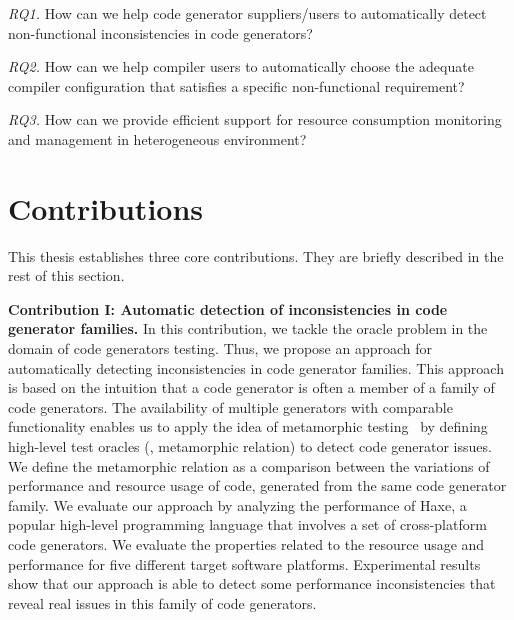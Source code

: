 \textit{RQ1.} How can we help code generator suppliers/users to automatically detect non-functional inconsistencies in code generators?

\textit{RQ2.} How can we help compiler users to automatically choose the adequate compiler configuration that satisfies a specific non-functional requirement?

\textit{RQ3.} How can we provide efficient support for resource consumption monitoring and management in heterogeneous environment?


\section{Contributions}
This thesis establishes three core contributions. They are briefly described in the rest of this section.

\textbf{Contribution I: Automatic detection of inconsistencies in code generator families.}
In this contribution, we tackle the oracle problem in the domain of code generators testing. Thus, we propose an approach for automatically detecting inconsistencies in code generator families.
This approach is based on the intuition that a code generator is often a member of a family of code generators. The availability of multiple generators with comparable functionality enables us to apply the idea of metamorphic testing~\cite{zhou2004metamorphic} by defining high-level test oracles (\ie, metamorphic relation) to detect code generator issues. We define the metamorphic relation as a comparison between the variations of performance and resource usage of code, generated from the same code generator family.
We evaluate our approach by analyzing the performance of Haxe, a popular high-level programming language that involves a set of cross-platform code generators. We evaluate the properties related to the resource usage and performance for five different target software platforms. Experimental results show that our approach is able to detect some performance inconsistencies that reveal real issues in this family of code generators.

